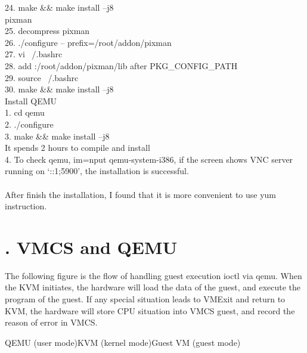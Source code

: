 \documentclass[11pt,draftclsnofoot,onecolumn,letterpaper]{IEEEtran}
\newcommand{\tab}{\hspace*{2em}}
\begin{document}
24. make \&\& make install –j8\\
pixman\\
25. decompress pixman\\
26. ./configure -- prefix=/root/addon/pixman\\
27. vi ~/.bashrc\\
28. add :/root/addon/pixman/lib after PKG\_CONFIG\_PATH\\
29. source ~/.bashrc\\
30. make \&\& make install –j8\\
Install QEMU\\
1.  cd qemu\\
2.  ./configure\\
3.  make \&\& make install –j8\\
It spends 2 hours to compile and install\\
4.  To check qemu, im=nput qemu-system-i386, if the screen shows VNC server running on ‘::1;5900’, the installation is successful.\\
\\After finish the installation, I found that it is more convenient to use yum instruction.\\

\newpage

\section*{\large{\uppercase\expandafter{}. VMCS and QEMU}}

The following figure is the flow of handling guest execution ioctl via qemu. When the KVM initiates, the hardware will load the data of the guest, and execute the program of the guest. If any special situation leads to VMExit and return to KVM, the hardware will store CPU situation into VMCS guest, and record the reason of error in VMCS. 

QEMU (user mode)\tab\tab\tab KVM (kernel mode)\tab\tab\tab Guest VM (guest mode)\\
\end{document}
